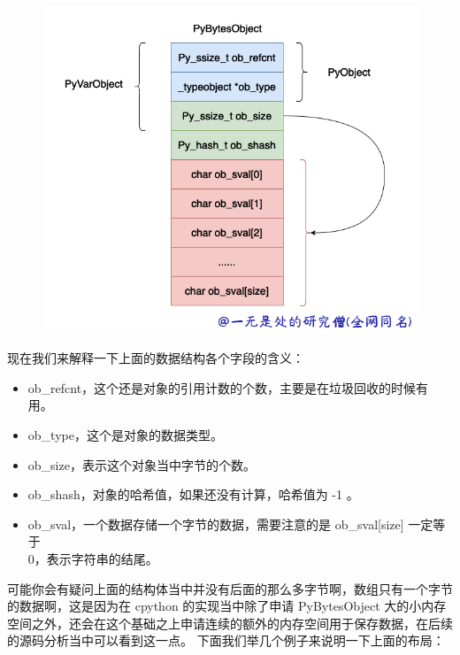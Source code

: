    \begin{figure}[H]
        \centering
            \includegraphics[scale=.25]{images/28-bytes.png}
						\caption{ }
        \label{fig:my_label}
    \end{figure}
    
现在我们来解释一下上面的数据结构各个字段的含义：
\begin{itemize}
\item ob\_refcnt，这个还是对象的引用计数的个数，主要是在垃圾回收的时候有用。 
\item ob\_type，这个是对象的数据类型。 
\item ob\_size，表示这个对象当中字节的个数。 
\item ob\_shash，对象的哈希值，如果还没有计算，哈希值为 -1 。 
\item ob\_sval，一个数据存储一个字节的数据，需要注意的是 ob\_sval[size] 一定等于 \'\\0\' ，表示字符串的结尾。 
\end{itemize}
可能你会有疑问上面的结构体当中并没有后面的那么多字节啊，数组只有一个字节的数据啊，这是因为在 cpython 的实现当中除了申请 PyBytesObject 大的小内存空间之外，还会在这个基础之上申请连续的额外的内存空间用于保存数据，在后续的源码分析当中可以看到这一点。
下面我们举几个例子来说明一下上面的布局：

